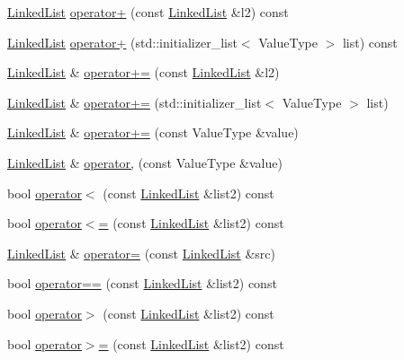 \begin{DoxyCompactItemize}
\item 
\mbox{\hyperlink{classLinkedList}{Linked\+List}} \mbox{\hyperlink{classLinkedList_a481f0eabff2912b261b522aaf561b067}{operator+}} (const \mbox{\hyperlink{classLinkedList}{Linked\+List}} \&l2) const
\item 
\mbox{\hyperlink{classLinkedList}{Linked\+List}} \mbox{\hyperlink{classLinkedList_a722fa9320d5ad78caeda370f755ddc7d}{operator+}} (std\+::initializer\+\_\+list$<$ Value\+Type $>$ list) const
\item 
\mbox{\hyperlink{classLinkedList}{Linked\+List}} \& \mbox{\hyperlink{classLinkedList_ae07506d03c2a077c0ade134416371c78}{operator+=}} (const \mbox{\hyperlink{classLinkedList}{Linked\+List}} \&l2)
\item 
\mbox{\hyperlink{classLinkedList}{Linked\+List}} \& \mbox{\hyperlink{classLinkedList_a7c08c1a4983616294a10bbbf43d3f8df}{operator+=}} (std\+::initializer\+\_\+list$<$ Value\+Type $>$ list)
\item 
\mbox{\hyperlink{classLinkedList}{Linked\+List}} \& \mbox{\hyperlink{classLinkedList_a032d4f974bb2083db2bab6a4e8e6f248}{operator+=}} (const Value\+Type \&value)
\item 
\mbox{\hyperlink{classLinkedList}{Linked\+List}} \& \mbox{\hyperlink{classLinkedList_a01622233116ad1ae4333e3e1ed1f7ca5}{operator,}} (const Value\+Type \&value)
\item 
bool \mbox{\hyperlink{classLinkedList_a1622208b00e2ffcf2ad120c1d748c784}{operator$<$}} (const \mbox{\hyperlink{classLinkedList}{Linked\+List}} \&list2) const
\item 
bool \mbox{\hyperlink{classLinkedList_ac25ce8222d0af74f8052d4106ec83cd0}{operator$<$=}} (const \mbox{\hyperlink{classLinkedList}{Linked\+List}} \&list2) const
\item 
\mbox{\hyperlink{classLinkedList}{Linked\+List}} \& \mbox{\hyperlink{classLinkedList_a8ba73804c2f6409d0f7fac8ab07caa75}{operator=}} (const \mbox{\hyperlink{classLinkedList}{Linked\+List}} \&src)
\item 
bool \mbox{\hyperlink{classLinkedList_a1000d6e937d2d5418896a1d572ced7b3}{operator==}} (const \mbox{\hyperlink{classLinkedList}{Linked\+List}} \&list2) const
\item 
bool \mbox{\hyperlink{classLinkedList_a7f2ff58a4330c932a1169f3afe73643f}{operator$>$}} (const \mbox{\hyperlink{classLinkedList}{Linked\+List}} \&list2) const
\item 
bool \mbox{\hyperlink{classLinkedList_aa512181cce227d2c83263f76d614ee65}{operator$>$=}} (const \mbox{\hyperlink{classLinkedList}{Linked\+List}} \&list2) const

\end{DoxyCompactItemize}
